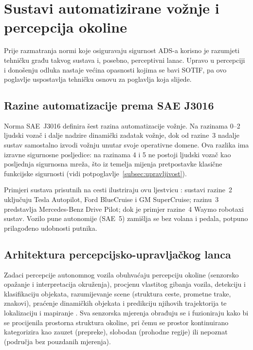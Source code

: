 \section{Sustavi automatizirane vožnje i percepcija okoline}
\label{sec:percepcija}

Prije razmatranja normi koje osiguravaju sigurnost ADS-a korisno je razumjeti tehničku građu takvog sustava i, posebno, perceptivni lanac. Upravo u percepciji i donošenju odluka nastaje većina opasnosti kojima se bavi SOTIF, pa ovo poglavlje uspostavlja tehničku osnovu za poglavlja koja slijede.

\subsection{Razine automatizacije prema SAE J3016}

Norma SAE~J3016 \cite{saej3016} definira šest razina automatizacije vožnje. Na razinama 0--2 ljudski vozač i dalje nadzire dinamički zadatak vožnje, dok od razine~3 nadalje sustav samostalno izvodi vožnju unutar svoje operativne domene. Ova razlika ima izravne sigurnosne posljedice: na razinama 4 i 5 ne postoji ljudski vozač kao posljednja sigurnosna mreža, što iz temelja mijenja pretpostavke klasične funkcijske sigurnosti (vidi potpoglavlje~\ref{subsec:upravljivost}).

Primjeri sustava prisutnih na cesti ilustriraju ovu ljestvicu \cite{hrgetic2025uvod}: sustavi razine~2 uključuju Tesla Autopilot, Ford BlueCruise i GM SuperCruise; razinu~3 predstavlja Mercedes-Benz Drive Pilot; dok je primjer razine~4 Waymo robotaxi sustav. Vozilo pune autonomije (SAE~5) zamišlja se bez volana i pedala, potpuno prilagođeno udobnosti putnika.

\subsection{Arhitektura percepcijsko-upravljačkog lanca}

Zadaci percepcije autonomnog vozila obuhvaćaju percepciju okoline (senzorsko opažanje i interpretacija okruženja), procjenu vlastitog gibanja vozila, detekciju i klasifikaciju objekata, razumijevanje scene (struktura ceste, prometne trake, znakovi), praćenje dinamičkih objekata i predikciju njihovih trajektorija te lokalizaciju i mapiranje \cite{suligoj2025percepcija1}. Sva senzorska mjerenja obrađuju se i fuzioniraju kako bi se procijenila prostorna struktura okoline, pri čemu se prostor kontinuirano kategorizira kao zauzet (prepreke), slobodan (prohodne regije) ili nepoznat (područja bez pouzdanih mjerenja).


